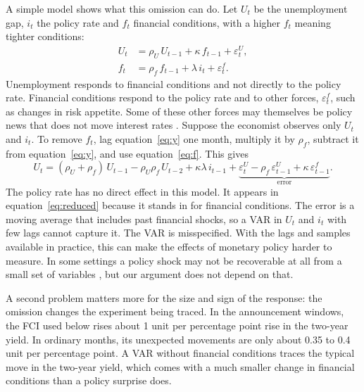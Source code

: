 \documentclass[11pt]{article}
\begin{document}
A simple model shows what this omission can do. Let $U_t$ be the unemployment gap, $i_t$ the policy rate and $f_t$ financial conditions, with a higher $f_t$ meaning tighter conditions:
\begin{align}
U_t &= \rho_U\,U_{t-1} + \kappa\,f_{t-1} + \varepsilon^{U}_t, \label{eq:y}\\
f_t &= \rho_f\,f_{t-1} + \lambda\,i_t + \varepsilon^{f}_t. \label{eq:f}
\end{align}
Unemployment responds to financial conditions and not directly to the policy rate. Financial conditions respond to the policy rate and to other forces, $\varepsilon^{f}_t$, such as changes in risk appetite. Some of these other forces may themselves be policy news that does not move interest rates \citep{boehm2024,bauer2026}. Suppose the economist observes only $U_t$ and $i_t$. To remove $f_t$, lag equation~\eqref{eq:y} one month, multiply it by $\rho_f$, subtract it from equation~\eqref{eq:y}, and use equation~\eqref{eq:f}. This gives
\begin{equation}
U_t = (\rho_U+\rho_f)\,U_{t-1} - \rho_U\rho_f\,U_{t-2} + \kappa\lambda\,i_{t-1} + \underbrace{\varepsilon^{U}_t - \rho_f\,\varepsilon^{U}_{t-1} + \kappa\,\varepsilon^{f}_{t-1}}_{\text{error}}. \label{eq:reduced}
\end{equation}
The policy rate has no direct effect in this model. It appears in equation~\eqref{eq:reduced} because it stands in for financial conditions. The error is a moving average that includes past financial shocks, so a VAR in $U_t$ and $i_t$ with few lags cannot capture it. The VAR is misspecified. With the lags and samples available in practice, this can make the effects of monetary policy harder to measure. In some settings a policy shock may not be recoverable at all from a small set of variables \citep{fernandez2007}, but our argument does not depend on that.

A second problem matters more for the size and sign of the response: the omission changes the experiment being traced. In the announcement windows, the FCI used below rises about 1 unit per percentage point rise in the two-year yield. In ordinary months, its unexpected movements are only about 0.35 to 0.4 unit per percentage point. A VAR without financial conditions traces the typical move in the two-year yield, which comes with a much smaller change in financial conditions than a policy surprise does.
\end{document}
